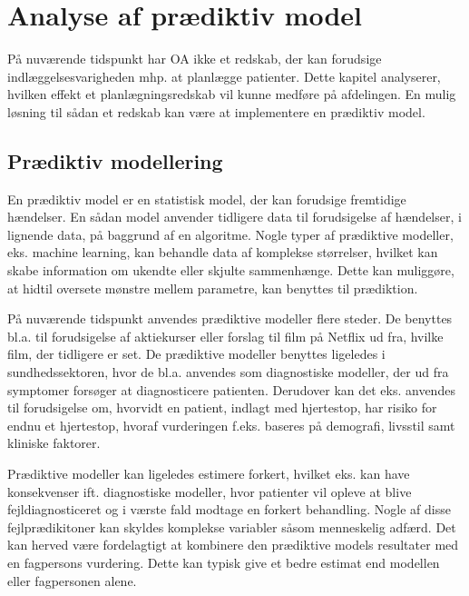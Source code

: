 \chapter{Analyse af prædiktiv model}
På nuværende tidspunkt har OA ikke et redskab, der kan forudsige indlæggelsesvarigheden mhp. at planlægge patienter. Dette kapitel analyserer, hvilken effekt et planlægningsredskab vil kunne medføre  på afdelingen. En mulig løsning til sådan et redskab kan være at implementere en prædiktiv model. 


\section{Prædiktiv modellering} \label{praemodel}
En prædiktiv model er en statistisk model, der kan forudsige fremtidige hændelser. En sådan model anvender tidligere data til forudsigelse af hændelser, i lignende data, på baggrund af en algoritme. Nogle typer af prædiktive modeller, eks. machine learning, kan behandle data af komplekse størrelser, hvilket kan skabe information om ukendte eller skjulte sammenhænge. Dette kan muliggøre, at hidtil oversete mønstre mellem parametre, kan benyttes til prædiktion.\cite{Kuhn2013}

På nuværende tidspunkt anvendes prædiktive modeller flere steder. De benyttes bl.a. til forudsigelse af aktiekurser eller forslag til film på Netflix ud fra, hvilke film, der tidligere er set.\cite{DIKU2010}
De prædiktive modeller benyttes ligeledes i sundhedssektoren, hvor de bl.a. anvendes som diagnostiske modeller, der ud fra symptomer forsøger at diagnosticere patienten.\cite{Kuhn2013} Derudover kan det eks. anvendes til forudsigelse om, hvorvidt en patient, indlagt med hjertestop, har risiko for endnu et hjertestop, hvoraf vurderingen f.eks. baseres på demografi, livsstil samt kliniske faktorer\cite{Hastie2008}. 

Prædiktive modeller kan ligeledes estimere forkert, hvilket eks. kan have konsekvenser ift. diagnostiske modeller, hvor patienter vil opleve at blive fejldiagnosticeret og i værste fald modtage en forkert behandling. Nogle af disse fejlprædikitoner kan skyldes komplekse variabler såsom menneskelig adfærd. Det kan herved være fordelagtigt at kombinere den prædiktive models resultater med en fagpersons vurdering. Dette kan typisk give et bedre estimat end modellen eller fagpersonen alene.\cite{Kuhn2013} 


